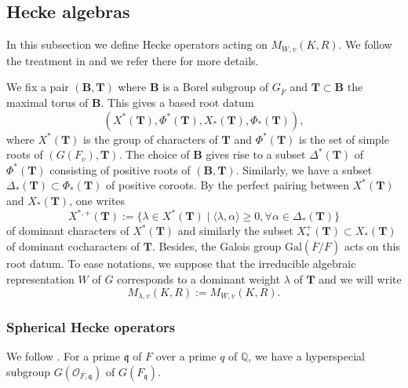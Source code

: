 \documentclass[12pt,oneside,reqno]{amsart}
\theoremstyle{plain}
\begin{document}
	
	\subsection{Hecke algebras}
	In this subsection
	we define Hecke operators acting on
	$M_{W,v}(K,R)$. We follow the treatment in \cite{Gross1999} and we refer there for more details.
	
	
	
	
	
	
	
	
	We fix a pair
	$(\mathbf{B},\mathbf{T})$
	where $\mathbf{B}$ is a Borel subgroup of $G_{\overline{F}}$
	and $\mathbf{T}\subset \mathbf{B}$
	the maximal torus of $\mathbf{B}$.
	This gives a based root datum
	\[
	(X^\ast(\mathbf{T}),\Phi^\ast(\mathbf{T}),
	X_\ast(\mathbf{T}),\Phi_\ast(\mathbf{T})),
	\]
	where
	$X^\ast(\mathbf{T})$
	is the group of characters of $\mathbf{T}$ and
	$\Phi^\ast(\mathbf{T})$
	is the set of simple roots of
	$(G(F_v),\mathbf{T})$.
	The choice of $\mathbf{B}$
	gives rise to a subset
	$\Delta^\ast(\mathbf{T})$
	of $\Phi^\ast(\mathbf{T})$
	consisting of positive roots of $(\mathbf{B},\mathbf{T})$.
	Similarly, we have a subset
	$\Delta_\ast(\mathbf{T})
	\subset
	\Phi_\ast(\mathbf{T})$
	of positive coroots.
	By the perfect pairing
	between
	$X^\ast(\mathbf{T})$
	and
	$X_\ast(\mathbf{T})$,	
	one writes
	\[
	X^{\ast,+}(\mathbf{T})
	:=
	\{
	\lambda\in X^\ast(\mathbf{T})\mid 
	\langle\lambda,\alpha\rangle\geq0,
	\forall
	\alpha\in
	\Delta_\ast(\mathbf{T})
	\}
	\]
	of dominant characters of $X^\ast(\mathbf{T})$
	and similarly
	the subset
	$X^+_\ast(\mathbf{T})
	\subset
	X_\ast(\mathbf{T})$
	of dominant cocharacters
	of $\mathbf{T}$.
	Besides, the Galois group
	$\mathrm{Gal}(\overline{F}/F)$
	acts on this root datum.
	To ease notations,
	we suppose that
	the irreducible algebraic representation
	$W$ of $G$
	corresponds to a dominant weight
	$\lambda$ of
	$\mathbf{T}$
	and we will write
	\[
	M_{\lambda,v}(K,R)
	:=
	M_{W,v}(K,R).
	\]
	
	
	
	
	
	
	
	\subsubsection{Spherical Hecke operators}
	We follow
	\cite[§16]{Gross1999}.
	For a prime $\mathfrak{q}$ of $F$ over a prime $q$ of $\mathbb{Q}$,
	we have a hyperspecial subgroup
	$G(\mathcal{O}_{F,\mathfrak{q}})$
	of
	$G(F_\mathfrak{q})$.
	
\end{document}
